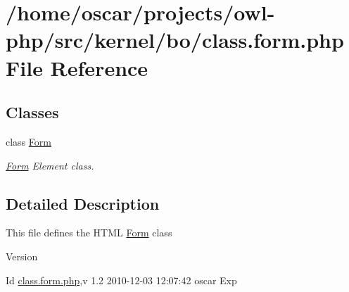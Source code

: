 \section{/home/oscar/projects/owl-\/php/src/kernel/bo/class.form.php File Reference}
\label{class_8form_8php}
\subsection*{Classes}
\begin{DoxyCompactItemize}
\item 
class \hyperlink{classForm}{Form}
\begin{DoxyCompactList}\small\item\em \hyperlink{classForm}{Form} Element class. \item\end{DoxyCompactList}\end{DoxyCompactItemize}


\subsection{Detailed Description}
This file defines the HTML \hyperlink{classForm}{Form} class \begin{DoxyVersion}{Version}

\end{DoxyVersion}
\begin{DoxyParagraph}{Id}
\hyperlink{class_8form_8php}{class.form.php},v 1.2 2010-\/12-\/03 12:07:42 oscar Exp 
\end{DoxyParagraph}
